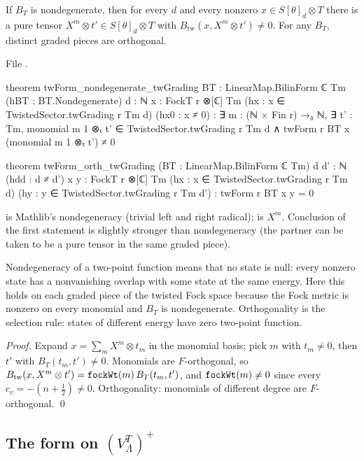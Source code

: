 \begin{theorem}\label{ch09:thm:twnondeg}
If $B_T$ is nondegenerate, then for every $d$ and every nonzero $x\in S[\theta]_d\otimes T$ there
is a pure tensor $X^m\otimes t'\in S[\theta]_d\otimes T$ with $B_{\mathrm{tw}}(x,X^m\otimes t')\neq0$.
For any $B_T$, distinct graded pieces are orthogonal.
\end{theorem}
\noindent File .
\begin{leancode}
theorem twForm_nondegenerate_twGrading {BT : LinearMap.BilinForm ℂ Tm} (hBT : BT.Nondegenerate)
    {d : ℕ} {x : FockT r ⊗[ℂ] Tm} (hx : x ∈ TwistedSector.twGrading r Tm d) (hx0 : x ≠ 0) :
    ∃ m : (ℕ × Fin r) →₀ ℕ, ∃ t' : Tm, monomial m 1 ⊗ₜ t' ∈ TwistedSector.twGrading r Tm d ∧
      twForm r BT x (monomial m 1 ⊗ₜ t') ≠ 0

theorem twForm_orth_twGrading (BT : LinearMap.BilinForm ℂ Tm) {d d' : ℕ} (hdd : d ≠ d')
    {x y : FockT r ⊗[ℂ] Tm} (hx : x ∈ TwistedSector.twGrading r Tm d)
    (hy : y ∈ TwistedSector.twGrading r Tm d') : twForm r BT x y = 0
\end{leancode}
\begin{dictionary}
 is Mathlib's nondegeneracy (trivial left and right radical);
 is $X^m$. Conclusion of the first statement is slightly stronger than
nondegeneracy (the partner can be taken to be a pure tensor in the same graded piece).
\end{dictionary}
\begin{physics}
Nondegeneracy of a two-point function means that no state is null: every nonzero state has a nonvanishing overlap with some state at the same energy. Here this holds on each graded piece of the twisted Fock space because the Fock metric is nonzero on every monomial and $B_T$ is nondegenerate. Orthogonality is the selection rule: states of different energy have zero two-point function.
\end{physics}

\noindent\emph{Proof.} Expand $x=\sum_mX^m\otimes t_m$ in the monomial basis; pick $m$ with
$t_m\neq0$, then $t'$ with $B_T(t_m,t')\neq0$. Monomials are $F$-orthogonal, so
$B_{\mathrm{tw}}(x,X^m\otimes t')=\lean{fockWt}(m)\,B_T(t_m,t')$, and $\lean{fockWt}(m)\neq0$ since
every $c_v=-(n+\frac12)\neq0$. Orthogonality: monomials of different degree are $F$-orthogonal. \qed

\subsection{The form on \texorpdfstring{$(V_\Lambda^T)^+$}{the twisted plus part}}

